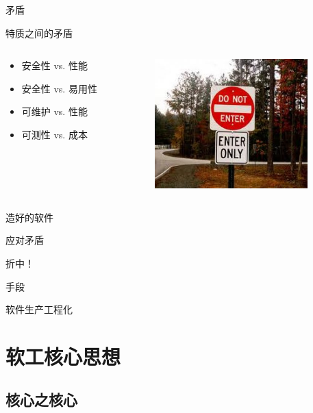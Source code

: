 \begin{frame}{矛盾}
  \begin{block}{特质之间的矛盾}
    \begin{columns}
      \begin{column}{.4\textwidth}
        \begin{itemize}
          \item 安全性 vs. 性能
          \item 安全性 vs. 易用性
          \item 可维护 vs. 性能
          \item 可测性 vs. 成本
        \end{itemize}
      \end{column}
      \begin{column}{.6\textwidth}
        \includegraphics[height=5cm]{contradiction.jpg}
      \end{column}
    \end{columns}
  \end{block}
\end{frame}

\begin{frame}{造好的软件}
  \begin{alertblock}{应对矛盾}
    \begin{center}
      \Huge 折中！
    \end{center}
  \end{alertblock}
  \pause
  \begin{block}{手段}
    \begin{center}
      \Huge 软件生产工程化
    \end{center}
  \end{block}
\end{frame}

\section{软工核心思想}

\subsection{核心之核心}

